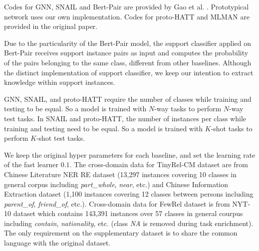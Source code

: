 Codes for GNN, SNAIL and Bert-Pair are provided by Gao et al. . Prototypical network uses our own implementation. Codes for proto-HATT and MLMAN are provided in the original paper.

Due to the particularity of the Bert-Pair model, the support classifier applied on Bert-Pair receives support instance pairs as input and computes the probability of the pairs belonging to the same class, different from other baselines. Although the distinct implementation of support classifier, we keep our intention to extract knowledge within support instances.

GNN, SNAIL, and proto-HATT require the number of classes while training and testing to be equal. So a model is trained with $N$-way tasks to perform $N$-way test tasks. In SNAIL and proto-HATT, the number of instances per class while training and testing need to be equal. So a model is trained with $K$-shot tasks to perform $K$-shot test tasks.

We keep the original hyper parameters for each baseline, and set the learning rate of the fast learner $0.1$. The cross-domain data for TinyRel-CM dataset are from Chinese Literature NER RE dataset \cite{dnerre} (13,297 instances covering 10 classes in general corpus including \emph{part\_whole}, \emph{near}, etc.) and Chinese Information Extraction dataset \cite{augdata} (1,100 instances covering 12 classes between persons including \emph{parent\_of}, \emph{friend\_of}, etc.). Cross-domain data for FewRel dataset is from NYT-10 dataset \cite{NYTdataset} which contains 143,391 instances over 57 classes in general courpus including \emph{contain}, \emph{nationality}, etc. (class \emph{NA} is removed during task enrichment).
The only requirement on the supplementary dataset is to share the common language with the original dataset.

